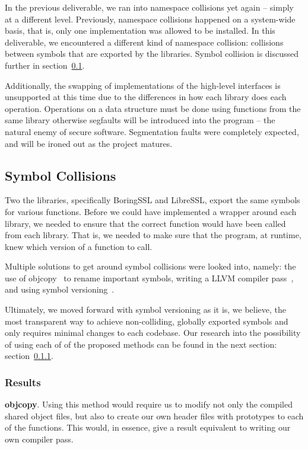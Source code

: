 \documentclass{acm_proc_article-sp}
\begin{document}
In the previous deliverable, we ran into namespace collisions yet again --
simply at a different level. Previously, namespace collisions happened on a
system-wide basis, that is, only one implementation was allowed to be installed.
In this deliverable, we encountered a different kind of namespace collision:
collisions between symbols that are exported by the libraries. Symbol collision
is discussed further in section~\ref{Sec:Symbol}.

Additionally, the swapping of implementations of the high-level interfaces is
unsupported at this time due to the differences in how each library does each
operation. Operations on a data structure must be done using functions from the
same library otherwise segfaults will be introduced into the program -- the
natural enemy of secure software. Segmentation faults were completely expected,
and will be ironed out as the project matures.

\subsection{Symbol Collisions}\label{Sec:Symbol}

Two the libraries, specifically BoringSSL and LibreSSL, export the same symbols
for various functions. Before we could have implemented a wrapper around each
library, we needed to ensure that the correct function would have been called
from each library. That is, we needed to make sure that the program, at runtime,
knew which version of a function to call.

Multiple solutions to get around symbol collisions were looked into, namely: the
use of objcopy~\cite{objcopy} to rename important symbols, writing a LLVM
compiler pass~\cite{llvmpass}, and using symbol versioning~\cite{versioning}.

Ultimately, we moved forward with symbol versioning as it is, we believe, the
most transparent way to achieve non-colliding, globally exported symbols and
only requires minimal changes to each codebase. Our research into the
possibility of using each of of the proposed methods can be found in the next
section: section~\ref{Sec:Res}.

\subsubsection{Results}\label{Sec:Res}

\textbf{objcopy}. Using this method would require us to modify not only the
compiled shared object files, but also to create our own header files with
prototypes to each of the functions. This would, in essence, give a result
equivalent to writing our own compiler pass.
\end{document}
